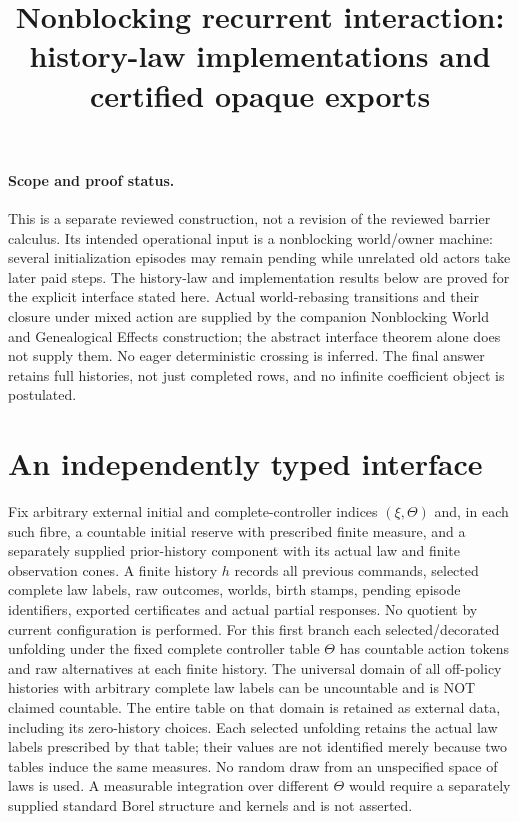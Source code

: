 \documentclass{article}
\title{Nonblocking recurrent interaction: history-law implementations and certified opaque exports}
\author{}\date{}
\begin{document}
\maketitle
\paragraph{Scope and proof status.}
This is a separate reviewed construction, not a revision of the reviewed barrier calculus. Its intended operational input is a nonblocking world/owner machine: several initialization episodes may remain pending while unrelated old actors take later paid steps. The history-law and implementation results below are proved for the explicit interface stated here. Actual world-rebasing transitions and their closure under mixed action are supplied by the companion Nonblocking World and Genealogical Effects construction; the abstract interface theorem alone does not supply them. No eager deterministic crossing is inferred. The final answer retains full histories, not just completed rows, and no infinite coefficient object is postulated.

\section{An independently typed interface}
Fix arbitrary external initial and complete-controller indices $(\xi,\Theta)$ and, in each such fibre, a countable initial reserve with prescribed finite measure, and a separately supplied prior-history component with its actual law and finite observation cones. A finite history $h$ records all previous commands, selected complete law labels, raw outcomes, worlds, birth stamps, pending episode identifiers, exported certificates and actual partial responses. No quotient by current configuration is performed. For this first branch each selected/decorated unfolding under the fixed complete controller table $\Theta$ has countable action tokens and raw alternatives at each finite history. The universal domain of all off-policy histories with arbitrary complete law labels can be uncountable and is NOT claimed countable. The entire table on that domain is retained as external data, including its zero-history choices. Each selected unfolding retains the actual law labels prescribed by that table; their values are not identified merely because two tables induce the same measures. No random draw from an unspecified space of laws is used. A measurable integration over different $\Theta$ would require a separately supplied standard Borel structure and kernels and is not asserted.
\end{document}
